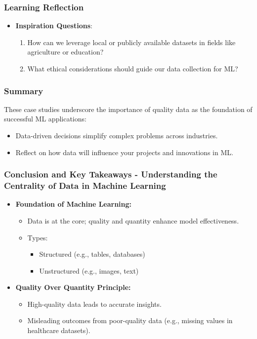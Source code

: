\documentclass[aspectratio=169]{beamer}
\begin{document}
\begin{frame}[fragile]
    \frametitle{Learning Reflection}
    \begin{itemize}
        \item \textbf{Inspiration Questions}:
        \begin{enumerate}
            \item How can we leverage local or publicly available datasets in fields like agriculture or education?
            \item What ethical considerations should guide our data collection for ML?
        \end{enumerate}
    \end{itemize}
\end{frame}

\begin{frame}[fragile]
    \frametitle{Summary}
    These case studies underscore the importance of quality data as the foundation of successful ML applications:
    \begin{itemize}
        \item Data-driven decisions simplify complex problems across industries.
        \item Reflect on how data will influence your projects and innovations in ML.
    \end{itemize}
\end{frame}

\begin{frame}[fragile]
    \frametitle{Conclusion and Key Takeaways - Understanding the Centrality of Data in Machine Learning}
    \begin{itemize}
        \item \textbf{Foundation of Machine Learning:} 
            \begin{itemize}
                \item Data is at the core; quality and quantity enhance model effectiveness.
                \item Types:
                    \begin{itemize}
                        \item Structured (e.g., tables, databases)
                        \item Unstructured (e.g., images, text)
                    \end{itemize}
            \end{itemize}
        \item \textbf{Quality Over Quantity Principle:} 
            \begin{itemize}
                \item High-quality data leads to accurate insights.
                \item Misleading outcomes from poor-quality data (e.g., missing values in healthcare datasets).
            \end{itemize}
    \end{itemize}
\end{frame}
\end{document}
